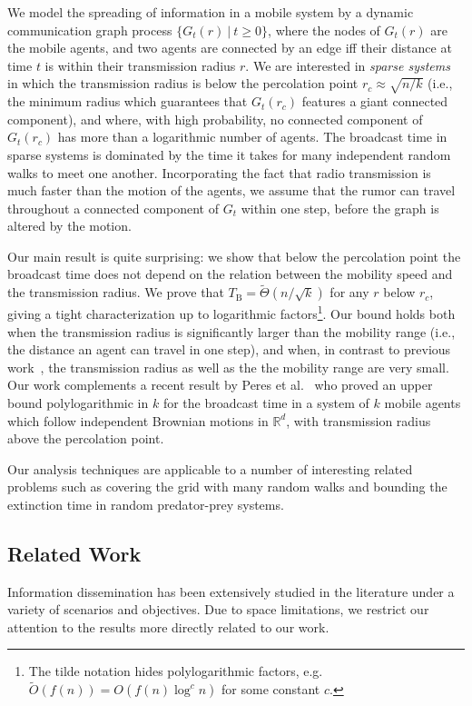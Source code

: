 \documentclass[11pt]{article}
\newcommand{\newterm}[1]{\emph{#1}}
\newcommand{\bigO}[1]{O\left(#1\right)}
\newcommand{\bigOt}[1]{\tilde{O}\left(#1\right)}
\newcommand{\bigTht}[1]{\tilde{\Theta}\left(#1\right)}
\newcommand{\bt}{T_{\mathrm{B}}}
\newcommand{\R}{\mathbb{R}}
\begin{document}
We model the spreading of information in a mobile system by a dynamic
communication graph process $\{G_t(r)~|~t\geq 0\}$, where the nodes of
$G_t(r)$ are the mobile agents, and two agents are connected by an
edge iff their distance at time $t$ is within their transmission
radius $r$.  We are interested in \newterm{sparse systems} in which
the transmission radius is below the percolation point $r_c \approx
\sqrt{n/k}$ \cite{Penrose03,PeresSSS11} (i.e., the minimum radius
which guarantees that $G_t(r_c)$ features a giant connected
component), and where, with high probability, no connected component
of $G_t(r_c)$ has more than a logarithmic number of agents. The
broadcast time in sparse systems is dominated by the time it takes for
many independent random walks to meet one another.  Incorporating the
fact that radio transmission is much faster than the motion of the
agents, we assume that the rumor can travel throughout a connected
component of $G_t$ within one step, before the graph is altered by the
motion.


Our main result is quite surprising: we show that below the
percolation point the broadcast time does not depend on the relation
between the mobility speed and the transmission radius. We prove that
$\bt = \bigTht{n / \sqrt{k}}$ for any $r$ below $r_c$, giving a tight
characterization up to logarithmic factors\footnote{The tilde notation hides polylogarithmic factors,
  e.g. $\bigOt{f(n)} = \bigO{f(n) \log^c n}$ for some constant $c$.}.
Our bound holds both when the transmission radius is significantly
larger than the mobility range (i.e., the distance an agent can travel
in one step), and when, in contrast to previous
work~\cite{ClementiMPS09, ClementiPS09}, the transmission radius as
well as the the mobility range are very small.  Our work complements a
recent result by Peres et al.~\cite{PeresSSS11} who proved an upper
bound polylogarithmic in $k$ for the broadcast time in a system of $k$
mobile agents which follow independent Brownian motions in $\R^d$, with
transmission radius above the percolation point.


Our analysis techniques are applicable to a number of interesting
related problems such as covering the grid with many random walks
and bounding the extinction time in random predator-prey systems.

\subsection{Related Work}

Information dissemination has been extensively studied in the
literature under a variety of scenarios and 
objectives. Due to space limitations, we restrict our attention to
the results more directly related to our work.
\end{document}
